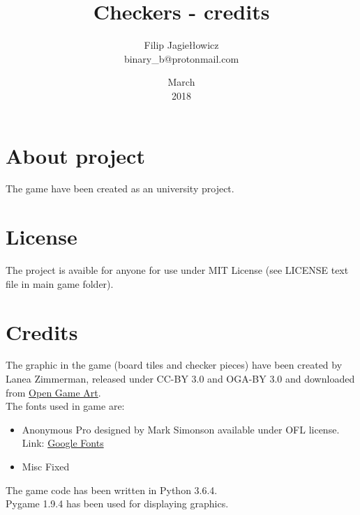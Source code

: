 \documentclass[11pt,a5paper]{article}
\title{Checkers - credits}
\author{Filip Jagiełłowicz\\ \small binary\_b@protonmail.com}
\date{March\\2018}
\begin{document}
\maketitle

\section{About project}
The game have been created as an university project.

\section{License}
The project is avaible for anyone for use under MIT License (see LICENSE text file in main game folder).

\section{Credits}
The graphic in the game (board tiles and checker pieces) have been created by Lanea Zimmerman, released under CC-BY 3.0 and OGA-BY 3.0 and downloaded from \href{https://opengameart.org/content/boardgame-tiles}{Open Game Art}.\\
The fonts used in game are:
\begin{itemize}
	\item Anonymous Pro designed by Mark Simonson available under OFL license.\\Link: \href{https://fonts.google.com/specimen/Anonymous+Pro}{Google Fonts}
	\item Misc Fixed
\end{itemize}
The game code has been written in Python 3.6.4.\\
Pygame 1.9.4 has been used for displaying graphics.
\end{document}
